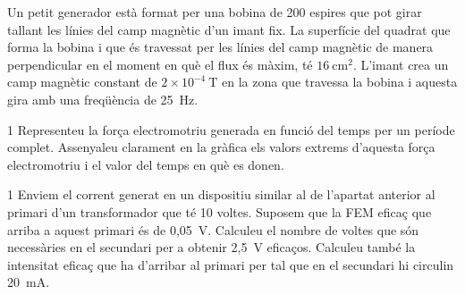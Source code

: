 Un petit generador està format per una bobina de 200 espires que pot girar tallant les línies del camp magnètic d'un imant fix. La superfície del quadrat que forma la bobina i que és travessat per les línies del camp magnètic de manera perpendicular en el moment en què el flux és màxim, té $16\ \mathrm{cm^2}$. L'imant crea un camp magnètic constant de $2\times 10^{-4}\ \mathrm{T}$ en la zona que travessa la bobina i aquesta gira amb una freqüència de 25~Hz.

\begin{apartat}{1}
Representeu la força electromotriu generada en funció del temps per un període complet. Assenyaleu clarament en la gràfica els valors extrems d'aquesta força electromotriu i el valor del temps en què es donen.
\end{apartat}

\begin{apartat}{1}
Enviem el corrent generat en un dispositiu similar al de l'apartat anterior al primari d'un transformador que té 10 voltes. Suposem que la FEM eficaç que arriba a aquest primari és de 0,05~V. Calculeu el nombre de voltes que són necessàries en el secundari per a obtenir 2,5~V eficaços. Calculeu també la intensitat eficaç que ha d'arribar al primari per tal que en el secundari hi circulin 20~mA.
\end{apartat}
